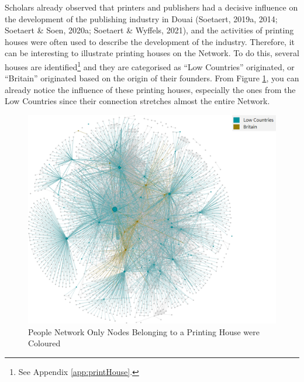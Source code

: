 \documentclass[12pt,a4paper,oneside]{book}
\begin{document}
\begin{sloppypar}
\begin{table}[H]
\centering
\caption{Network Metrics of Laurence I Kellam and Laurence II Kellam}
\label{tab:kellamMetrics}
\end{table}

Scholars already observed that printers and publishers had a decisive influence on the development of the publishing industry in Douai (Soetaert, 2019a, 2014; Soetaert \& Soen, 2020a; Soetaert \& Wyffels, 2021), and the activities of printing houses were often used to describe the development of the industry. Therefore, it can be interesting to illustrate printing houses on the Network. To do this, several houses are identified\footnote{See Appendix \ref{app:printHouse}.} and they are categorised as “Low Countries” originated, or “Britain” originated based on the origin of their founders. From Figure \ref{fig:onlyPrint}, you can already notice the influence of these printing houses, especially the ones from the Low Countries since their connection stretches almost the entire Network.

\begin{figure}[H]
\centering
\includegraphics[scale=0.5]{graph/People Network Only Nodes Belonging to a Printing House were Coloured.png}
\caption{People Network Only Nodes Belonging to a Printing House were Coloured}
\label{fig:onlyPrint}
\end{figure}


\end{sloppypar}
\end{document}
